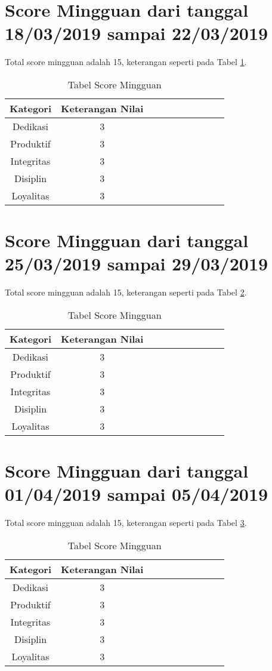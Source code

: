 \section{Score Mingguan dari tanggal 18/03/2019 sampai 22/03/2019}
Total score mingguan adalah 15,  keterangan seperti pada Tabel \ref{table:scoremingguan4}.
\begin{table}[!ht]
\centering
\begin{tabular}{ |c|c|c|c|c|c|c|c|c|c| }
\hline
Kategori & Keterangan Nilai \\
\hline
Dedikasi & 3 \\
\hline
Produktif & 3 \\
\hline
Integritas & 3 \\
\hline
Disiplin & 3 \\
\hline
Loyalitas & 3 \\
\hline
\end{tabular}
\caption{Tabel Score Mingguan}
\label{table:scoremingguan4}
\end{table}



\section{Score Mingguan dari tanggal 25/03/2019 sampai 29/03/2019}
Total score mingguan adalah 15,  keterangan seperti pada Tabel \ref{table:scoremingguan5}.
\begin{table}[!ht]
\centering
\begin{tabular}{ |c|c|c|c|c|c|c|c|c|c| }
\hline
Kategori & Keterangan Nilai \\
\hline
Dedikasi & 3 \\
\hline
Produktif & 3 \\
\hline
Integritas & 3 \\
\hline
Disiplin & 3 \\
\hline
Loyalitas & 3 \\
\hline
\end{tabular}
\caption{Tabel Score Mingguan}
\label{table:scoremingguan5}
\end{table}



\section{Score Mingguan dari tanggal 01/04/2019 sampai 05/04/2019}
Total score mingguan adalah 15,  keterangan seperti pada Tabel \ref{table:scoremingguan6}.
\begin{table}[!ht]
\centering
\begin{tabular}{ |c|c|c|c|c|c|c|c|c|c| }
\hline
Kategori & Keterangan Nilai \\
\hline
Dedikasi & 3 \\
\hline
Produktif & 3 \\
\hline
Integritas & 3 \\
\hline
Disiplin & 3 \\
\hline
Loyalitas & 3 \\
\hline
\end{tabular}
\caption{Tabel Score Mingguan}
\label{table:scoremingguan6}
\end{table}


